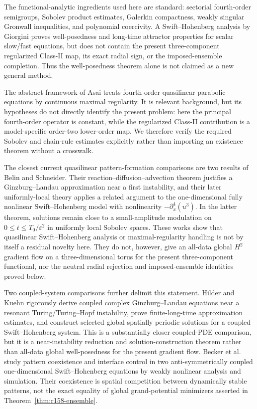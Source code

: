 \documentclass[11pt]{article}
\numberwithin{equation}{section}
\theoremstyle{definition}
\newcommand{\eps}{\varepsilon}
\begin{document}
The functional-analytic ingredients used here are standard: sectorial
fourth-order semigroups, Sobolev product estimates, Galerkin compactness,
weakly singular Gronwall inequalities, and polynomial coercivity.  A
Swift--Hohenberg analysis by Giorgini \cite{Giorgini} proves well-posedness and
long-time attractor properties for scalar slow/fast equations, but does not contain the
present three-component regularized Class-II map, its exact radial sign, or
the imposed-ensemble completion.  Thus the well-posedness theorem alone is
not claimed as a new general method.

The abstract framework of Asai \cite{Asai} treats fourth-order quasilinear
parabolic equations by continuous maximal regularity.  It is relevant
background, but its hypotheses do not directly identify the present problem:
here the principal fourth-order operator is constant, while the regularized
Class-II contribution is a model-specific order-two lower-order map.  We
therefore verify the required Sobolev and chain-rule estimates explicitly
rather than importing an existence theorem without a crosswalk.

The closest current quasilinear pattern-formation comparisons are two results
of Belin and Schneider.  Their reaction--diffusion--advection theorem
\cite{BelinSchneiderRDA} justifies a Ginzburg--Landau approximation near a
first instability, and their later uniformly-local theory
\cite{BelinSchneiderSH} applies a related argument to the one-dimensional
fully nonlinear Swift--Hohenberg model with nonlinearity
$-\partial_x^4(u^3)$.  In the latter theorem, solutions remain close to a
small-amplitude modulation on $0\le t\le T_0/\eps^2$ in uniformly local
Sobolev spaces.  These works show that quasilinear Swift--Hohenberg analysis
or maximal-regularity handling is not by itself a residual novelty here.
They do not, however, give an all-data global $H^2$ gradient flow on a
three-dimensional torus for the present three-component functional, nor the
neutral radial rejection and imposed-ensemble identities proved below.

Two coupled-system comparisons further delimit this statement.  Hilder and
Kuehn \cite{HilderKuehn} rigorously derive coupled complex
Ginzburg--Landau equations near a resonant Turing/Turing--Hopf instability,
prove finite-long-time approximation estimates, and construct selected
global spatially periodic solutions for a coupled Swift--Hohenberg system.
This is a substantially closer coupled-PDE comparison, but it is a
near-instability reduction and solution-construction theorem rather than
all-data global well-posedness for the present gradient flow.  Becker et al.
\cite{BeckerEtAl} study pattern coexistence and interface control in two
anti-symmetrically coupled one-dimensional Swift--Hohenberg equations by
weakly nonlinear analysis and simulation.  Their coexistence is spatial
competition between dynamically stable patterns, not the exact equality of
global grand-potential minimizers asserted in Theorem~\ref{thm:r158-ensemble}.
\end{document}
